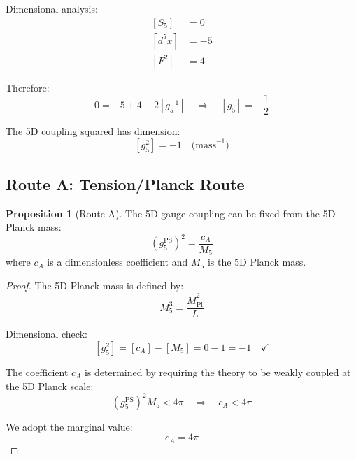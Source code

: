 \documentclass[11pt,a4paper]{article}
\theoremstyle{definition}
\newtheorem{proposition}[theorem]{Proposition}
\begin{document}
Dimensional analysis:
\begin{align}
\label{eq:dim-s5}
[S_5] &= 0 \\
\label{eq:dim-d5x}
[d^5x] &= -5 \\
\label{eq:dim-f2}
[F^2] &= 4
\end{align}

Therefore:
\begin{equation}
\label{eq:g5-dim-result}
0 = -5 + 4 + 2[g_5^{-1}] \quad \Rightarrow \quad [g_5] = -\frac{1}{2}
\end{equation}

The 5D coupling squared has dimension:
\begin{equation}
\label{eq:g5-sq-dim}
\boxed{[g_5^2] = -1 \quad \text{(mass}^{-1}\text{)}}
\end{equation}

\subsection{Route A: Tension/Planck Route}
\label{subsec:route-a}

\begin{routebox}
\begin{proposition}[Route A]
\label{prop:route-a}
The 5D gauge coupling can be fixed from the 5D Planck mass:
\begin{equation}
\label{eq:route-a-formula}
\boxed{(g_5^{\text{PS}})^2 = \frac{c_A}{M_5}}
\end{equation}
where $c_A$ is a dimensionless coefficient and $M_5$ is the 5D Planck mass.
\end{proposition}
\end{routebox}

\begin{proof}
The 5D Planck mass is defined by:
\begin{equation}
\label{eq:m5-def}
M_5^3 = \frac{\bar{M}_{\text{Pl}}^2}{L}
\end{equation}

Dimensional check:
\begin{equation}
\label{eq:route-a-dim}
[g_5^2] = [c_A] - [M_5] = 0 - 1 = -1 \quad \checkmark
\end{equation}

The coefficient $c_A$ is determined by requiring the theory to be weakly coupled
at the 5D Planck scale:
\begin{equation}
\label{eq:ca-constraint}
(g_5^{\text{PS}})^2 M_5 < 4\pi \quad \Rightarrow \quad c_A < 4\pi
\end{equation}

We adopt the marginal value:
\begin{equation}
\label{eq:ca-value}
c_A = 4\pi
\end{equation}
\end{proof}
\end{document}
